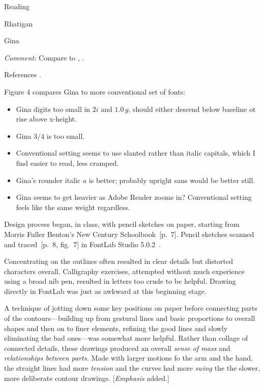 \documentclass[11pt]{PalisadesLakesBook}
\begin{document}
\begin{plSection}{Reading}
\begin{plSection}{Rhatigan}
\begin{plSection}{Gina}
\begin{plSection}{}
\emph{Comment:} 
Compare to ,
.

References .

Figure 4 compares Gina to more conventional set of fonts:
\begin{itemize}
  \item Gina digits too small in $2i$ and $1.0\,g$, 
  should either descend below baseline ot rise above x-height.
  \item Gina $3/4$ is too small.
  \item Conventional setting seems to use slanted rather 
  than italic capitals, which I find easier to read, less cramped.
  \item Gina's rounder italic $\mathit{a}$ is better; 
  probably upright sans would be better still.
  \item Gina seems to get heavier as Adobe Reader zooms in?
  Conventional setting feels like the same weight regardless. 
\end{itemize}

Design process began, in class, with pencil sketches on paper,
starting from Morris Fuller Benton's New Century 
Schoolbook~[p.~7].
Pencil sketches scanned and traced~[p.~8, fig.~7] 
in FontLab Studio 5.0.2~\cite{FontLab:2021}.

\begin{plQuote}{}{}
Concentrating on the outlines often resulted in clear details
but distorted characters overall.
Calligraphy exercises, attempted without much experience 
using a broad nib pen, resulted in letters too crude
to be helpful. Drawing directly in FontLab was just as awkward
at this beginning stage.

A technique of jotting down some key positions on paper
before connecting parts of the contours---building up from gestural
lines and basic proportions to overall shapes 
and then on to finer elements, 
refining the good lines and slowly eliminating the bad ones---was
somewhat more helpful.
Rather than collage of connected details,
these drawings produced an overall \emph{sense of mass} 
and \emph{relationships between parts.}
Made with larger motions fo the arm and the hand,
the straight lines had more \emph{tension}
and the curves had more \emph{swing} 
the the slower, more deliberate contour drawings.
[\emph{Emphasis} added.]
\end{plQuote}


\end{plSection}
\end{plSection}
\end{plSection}
\end{plSection}
\end{document}
